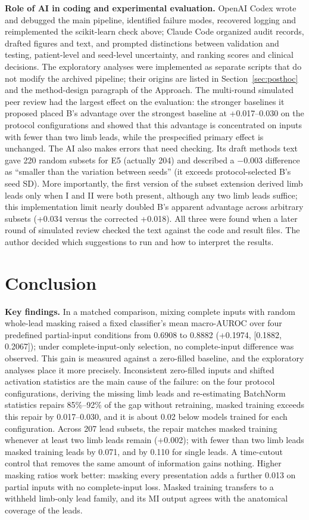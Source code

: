 \textbf{Role of AI in coding and experimental evaluation.} OpenAI Codex wrote and debugged the main pipeline, identified failure modes, recovered logging and reimplemented the scikit-learn check above; Claude Code organized audit records, drafted figures and text, and prompted distinctions between validation and testing, patient-level and seed-level uncertainty, and ranking scores and clinical decisions. The exploratory analyses were implemented as separate scripts that do not modify the archived pipeline; their origins are listed in Section~\ref{sec:posthoc} and the method-design paragraph of the Approach. The multi-round simulated peer review had the largest effect on the evaluation: the stronger baselines it proposed placed B's advantage over the strongest baseline at +0.017--0.030 on the protocol configurations and showed that this advantage is concentrated on inputs with fewer than two limb leads, while the prespecified primary effect is unchanged. The AI also makes errors that need checking. Its draft methods text gave 220 random subsets for E5 (actually 204) and described a $-$0.003 difference as ``smaller than the variation between seeds'' (it exceeds protocol-selected B's seed SD). More importantly, the first version of the subset extension derived limb leads only when I and II were both present, although any two limb leads suffice; this implementation limit nearly doubled B's apparent advantage across arbitrary subsets (+0.034 versus the corrected +0.018). All three were found when a later round of simulated review checked the text against the code and result files. The author decided which suggestions to run and how to interpret the results.

\section{Conclusion}

\textbf{Key findings.} In a matched comparison, mixing complete inputs with random whole-lead masking raised a fixed classifier's mean macro-AUROC over four predefined partial-input conditions from 0.6908 to 0.8882 (+0.1974, [0.1882, 0.2067]); under complete-input-only selection, no complete-input difference was observed. This gain is measured against a zero-filled baseline, and the exploratory analyses place it more precisely. Inconsistent zero-filled inputs and shifted activation statistics are the main cause of the failure: on the four protocol configurations, deriving the missing limb leads and re-estimating BatchNorm statistics repairs 85\%--92\% of the gap without retraining, masked training exceeds this repair by 0.017--0.030, and it is about 0.02 below models trained for each configuration. Across 207 lead subsets, the repair matches masked training whenever at least two limb leads remain (+0.002); with fewer than two limb leads masked training leads by 0.071, and by 0.110 for single leads. A time-cutout control that removes the same amount of information gains nothing. Higher masking ratios work better: masking every presentation adds a further 0.013 on partial inputs with no complete-input loss. Masked training transfers to a withheld limb-only lead family, and its MI output agrees with the anatomical coverage of the leads.

